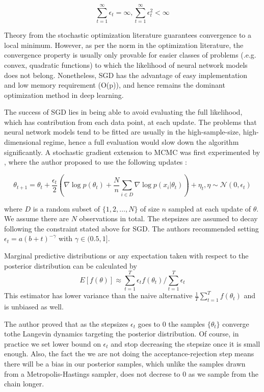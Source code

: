 \documentclass{book}
\begin{document}
\begin{enumerate}
\[ \sum_{t=1}^\infty \epsilon_t = \infty , \sum_{t=1}^\infty \epsilon_t^2 < \infty \]

Theory from the stochastic optimization literature \cite{robbins1951stochastic} guarantees convergence to a local minimum. However, as per the norm in the optimization literature, the convergence property is usually only provable for easier classes of problems (.e.g. convex, quadratic functions) to which the likelihood of neural network models does not belong. Nonetheless, SGD has the advantage of easy implementation and low memory requirement (O(p)), and hence remains the dominant optimization method in deep learning.  

The success of SGD lies in being able to avoid evaluating the full likelihood, which has contribution from each data point, at each update. The problems that neural network models tend to be fitted are usually in the high-sample-size, high-dimensional regime, hence a full evaluation would slow down the algorithm significantly. A stochastic gradient extension to MCMC was first experimented by \cite{welling2011bayesian}, where the author proposed to use the following updates :

\[\theta_{t+1} = \theta_t + \frac{\epsilon_t}{2} ( \nabla \log p(\theta_t) + \frac{N}{n} \sum_{i \in D} \nabla \log p(x_i|\theta_t) ) + \eta_t , \eta \sim \mathcal{N}(0,\epsilon_t) \]

where $D$ is a random subset of $\{1,2, \dots, N\}$ of size $n$ sampled at each update of $\theta$. We assume there are $N$ observations in total. The stepsizes are assumed to decay following the constraint stated above for SGD. The authors recommended setting $\epsilon_t = a(b+t)^{-\gamma} $ with $\gamma \in (0.5,1]$.  

Marginal predictive distributions or any expectation taken with respect to the posterior distribution can be calculated by 
\[ E[f(\theta)] \approx \sum_{t=1}^T \epsilon_t f(\theta_t) / \sum_{t=1}^T \epsilon_t \] 
This estimator has lower variance than the naive alternative $\frac{1}{T} \sum_{t=1}^T f(\theta_t) $ and is unbiased as well. 

The author proved that as the stepsizes $\epsilon_t$ goes to $0$ the samples $\{\theta_t\}$ converge tothe Langevin dynamics targeting the posterior distribution. Of course, in practice we set lower bound on $\epsilon_t$ and stop decreasing the stepsize once it is small enough. Also, the fact the we are not doing the acceptance-rejection step means there will be a bias in our posterior samples, which unlike the samples drawn from a Metropolis-Hastings sampler, does not decrese to $0$ as we sample from the chain longer.


\end{enumerate}
\end{document}
